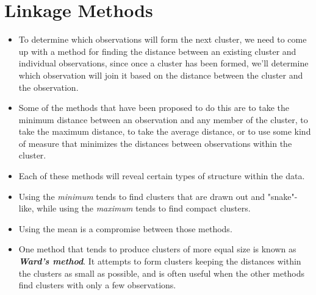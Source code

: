 \documentclass[SKLCluster.tex]{subfiles}
\begin{document}
\section{ Linkage Methods}
\begin{itemize}
\item To determine which observations will form the next cluster, we need to come up with a method for finding the distance between an existing cluster and individual observations, since once a cluster has been formed, we'll determine which observation will join it based on the distance between the cluster and the observation. 
\item Some of the methods that have been proposed to do this are to take the minimum distance between an observation and any member of the cluster, to take the maximum distance, to take the average distance, or to use some kind of measure that minimizes the distances between observations within the cluster. 
\item Each of these methods will reveal certain types of structure within the data. \item Using the \textit{minimum} tends to find clusters that are drawn out and "snake"-like, while using the \textit{maximum} tends to find compact clusters. 
\item Using the mean is a compromise between those methods.
\item One method that tends to produce clusters of more equal size is known as \textbf{\textit{Ward's method}}. It attempts to form clusters keeping the distances within the clusters as small as possible, and is often useful when the other methods find clusters with only a few observations. 
\end{itemize}

\newpage
\end{document}
